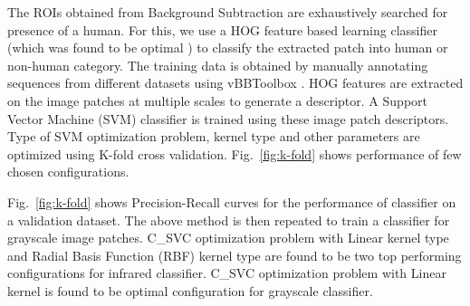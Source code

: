 \documentclass[runningheads]{llncs}
\begin{document}
The ROIs obtained from Background Subtraction are exhaustively searched for presence of a human. For this, we use a HOG feature based learning classifier (which was found to be optimal \cite{portmann2014people}) to classify the extracted patch into human or non-human category. The training data is obtained by manually annotating sequences from different datasets using vBBToolbox \cite{PMT}. HOG features are extracted on the image patches at multiple scales to generate a descriptor. A Support Vector Machine (SVM) classifier is trained using these image patch descriptors. Type of SVM optimization problem, kernel type and other parameters are optimized using K-fold cross validation. Fig.~\ref{fig:k-fold} shows performance of few chosen configurations.

Fig.~\ref{fig:k-fold} shows Precision-Recall curves for the performance of classifier on a validation dataset. The above method is then repeated to train a classifier for grayscale image patches. C\_SVC \cite{svm} optimization problem with Linear kernel type and Radial Basis Function (RBF) kernel type are found to be two top performing configurations for infrared classifier. C\_SVC optimization problem with Linear kernel is found to be optimal configuration for grayscale classifier.
\end{document}
